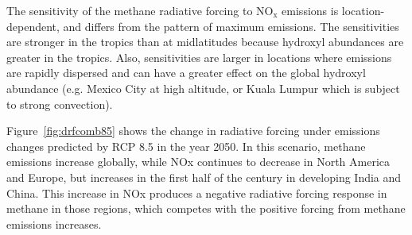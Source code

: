 The sensitivity of the methane radiative forcing to $\mathrm{NO_x}$ emissions is location-dependent, and differs from the pattern of maximum emissions. The sensitivities are stronger in the tropics than at midlatitudes because hydroxyl abundances are greater in the tropics. Also, sensitivities are larger in locations where emissions are rapidly dispersed and can have a greater effect on the global hydroxyl abundance (e.g. Mexico City at high altitude, or Kuala Lumpur which is subject to strong convection).

Figure~\ref{fig:drfcomb85} shows the change in radiative forcing under emissions changes predicted by RCP 8.5 in the year 2050. In this scenario, methane emissions increase globally, while NOx continues to decrease in North America and Europe, but increases in the first half of the century in developing India and China. This increase in NOx produces a negative radiative forcing response in methane in those regions, which competes with the positive forcing from methane emissions increases.